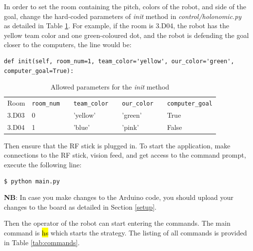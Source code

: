 \documentclass[a4paper,12pt]{article}
\newcommand{\hg}[1]{\hl{\ttfamily #1}}
\begin{document}
In order to set the room containing the pitch, colors of the robot, and side of the goal, change the hard-coded parameters of \textit{init} method in \textit{control/holonomic.py} as detailed in Table \ref{tab:params}.
For example, if the room is 3.D04, the robot has the yellow team color and one green-coloured dot, and the robot is defending the goal closer to the computers, the line would be:
\begin{lstlisting}
def init(self, room_num=1, team_color='yellow', our_color='green', computer_goal=True):
\end{lstlisting}

\begin{table}[h!]
\centering
\begin{tabular}{ | l | l | l | l | l | l | l | l | }
    \cline{1-2} \cline{4-4} \cline{6-6} \cline{8-8}
    Room & \texttt{room\_num} & & \texttt{team\_color} & & \texttt{our\_color} & & \texttt{computer\_goal} \\ 
    \cline{1-2} \cline{4-4} \cline{6-6} \cline{8-8}
    3.D03 & 0 & & 'yellow' & & 'green' & & True \\ 
    \cline{1-2} \cline{4-4} \cline{6-6} \cline{8-8}
    3.D04 & 1 & & 'blue' & & 'pink' & & False \\ 
    \cline{1-2} \cline{4-4} \cline{6-6} \cline{8-8}
\end{tabular}
\caption{Allowed parameters for the \textit{init} method}
\label{tab:params}
\end{table}

Then ensure that the RF stick is plugged in. To start the application, make connections to the RF stick, vision feed, and get access to the command prompt, execute the following line:
\begin{lstlisting}
$ python main.py
\end{lstlisting}

\textbf{NB}: In case you make changes to the Arduino code, you should upload your changes to the board as detailed in Section \ref{setup}.

Then the operator of the robot can start entering the commands. The main command is \hg{hs} which starts the strategy. The listing of all commands is provided in Table \ref{tab:commands}.
\end{document}

